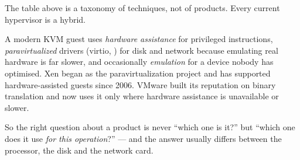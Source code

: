 \begin{alertbox}
The table above is a taxonomy of techniques, not of products. Every current
hypervisor is a hybrid.

\smallskip
A modern KVM guest uses \emph{hardware assistance} for privileged instructions,
\emph{paravirtualized} drivers (virtio, ) for disk and network
because emulating real hardware is far slower, and occasionally \emph{emulation}
for a device nobody has optimised. Xen began as the paravirtualization project
and has supported hardware-assisted guests since 2006. VMware built its
reputation on binary translation and now uses it only where hardware assistance
is unavailable or slower.

\smallskip
So the right question about a product is never ``which one is it?'' but ``which
one does it use \emph{for this operation}?'' --- and the answer usually differs
between the processor, the disk and the network card.
\end{alertbox}

